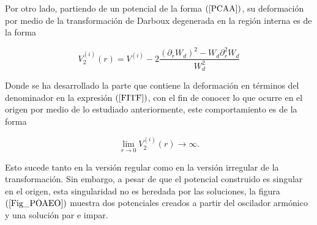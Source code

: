 Por otro lado, partiendo de un potencial de la forma $(\ref{PCAA})$, su deformación por medio de la transformación de Darboux degenerada en la región interna es de la forma

\begin{equation}
V_2^{(i)}(r) = V^{(i)} - 2 \frac{(\partial_r W_d)^2 - W_d \partial^2_r W_d}{W_d^2} \label{PDTWd}
\end{equation}

Donde se ha desarrollado la parte que contiene la deformación en términos del denominador en la expresión $(\ref{FITF})$, con el fin de conocer lo que ocurre en el origen por medio de lo estudiado anteriormente, este comportamiento es de la forma

\begin{equation*}
\lim_{r \to 0} V_2^{(i)}(r) \rightarrow \infty.
\end{equation*}

Esto sucede tanto en la versión regular como en la versión irregular de la transformación. Sin embargo, a pesar de que el potencial construido es singular en el origen, esta singularidad no es heredada por las soluciones, la figura $(\ref{Fig_POAEO})$ muestra dos potenciales creados a partir del oscilador armónico y una solución par e impar.

